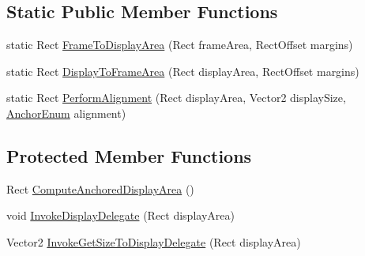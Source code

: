 \subsection*{Static Public Member Functions}
\begin{DoxyCompactItemize}
\item 
static Rect \hyperlink{class_d_s_cell_view_acc0dd2d9bce531723f86ca356ec6a1c7}{Frame\+To\+Display\+Area} (Rect frame\+Area, Rect\+Offset margins)
\item 
static Rect \hyperlink{class_d_s_cell_view_a6f25fe2e7d6975809bafa62bce590aa7}{Display\+To\+Frame\+Area} (Rect display\+Area, Rect\+Offset margins)
\item 
static Rect \hyperlink{class_d_s_cell_view_a84d31355b1f6eeb04239f2526301b2e5}{Perform\+Alignment} (Rect display\+Area, Vector2 display\+Size, \hyperlink{class_d_s_view_a8b41b9ec1b18bd33872a37cbd3a2dbe1}{Anchor\+Enum} alignment)
\end{DoxyCompactItemize}
\subsection*{Protected Member Functions}
\begin{DoxyCompactItemize}
\item 
Rect \hyperlink{class_d_s_cell_view_a7d642e7058b09deac61ab51d1ac865a5}{Compute\+Anchored\+Display\+Area} ()
\item 
void \hyperlink{class_d_s_cell_view_ab37ccb3aa03e3089895a657d94395723}{Invoke\+Display\+Delegate} (Rect display\+Area)
\item 
Vector2 \hyperlink{class_d_s_cell_view_aab7b3ca68fa5e37edcb48c98cbf50fa8}{Invoke\+Get\+Size\+To\+Display\+Delegate} (Rect display\+Area)
\end{DoxyCompactItemize}
